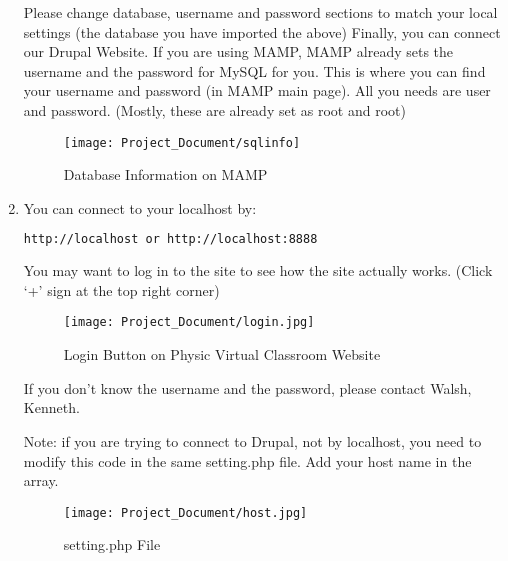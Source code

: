 \documentclass[10pt]{article}
\begin{document}
\begin{enumerate}
                Please change database, username and password sections to match your local settings (the database you have imported the above) Finally, you can connect our Drupal Website. If you are using MAMP, MAMP already sets the username and the password for MySQL for you. This is where you can find your username and password (in MAMP main page). All you needs are user and password. (Mostly, these are already set as root and root) 
           
                    \begin{figure}[!ht]
                           \centering
                           \texttt{[image: Project\_Document/sqlinfo]}
                        \caption{Database Information on MAMP}
                    \end{figure}
                    
            \item You can connect to your localhost by:
            
\begin{lstlisting}[language=bash]
http://localhost or http://localhost:8888
\end{lstlisting}
            
            You may want to log in to the site to see how the site actually works. (Click `+' sign at the top right corner) 
            
                \begin{figure}[!ht]
                       \centering
                         \texttt{[image: Project\_Document/login.jpg]}
                    \caption{Login Button on Physic Virtual Classroom Website}
                \end{figure}
\newpage            
            If you don’t know the username and the password, please contact Walsh, Kenneth.
            
            Note: if you are trying to connect to Drupal, not by localhost, you need to modify this code in the same setting.php file. Add your host name in the array.
            
                \begin{figure}[!ht]
                       \centering
                       \texttt{[image: Project\_Document/host.jpg]}
                    \caption{setting.php File}
                \end{figure}
        \end{enumerate}  
        
\end{document}
